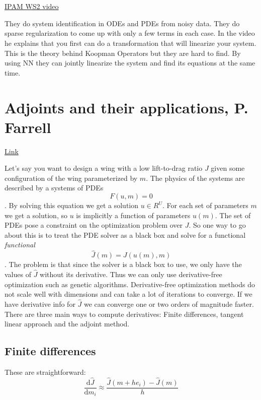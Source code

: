 \documentclass{article}
\newcommand{\citeall}[1]{\citeauthor{#1}}
\begin{document}
\section{\citeall{Brunton2016DiscoveringSystems}}

\href{http://www.ipam.ucla.edu/abstract/?tid=15783&pcode=MLPWS2}{IPAM WS2 video}

They do system identification in ODEs and PDEs from noisy data. They do sparse regularization to come up with only a few terms in each case. In the video he explains that you first can do a transformation that will linearize your system. This is the theory behind Koopman Operators but they are hard to find. By using NN they can jointly linearize the system and find its equations at the same time. 

\section{Adjoints and their applications, P. Farrell}

\href{dolfin-adjoint.org/en/latest/documentation/maths/index.html}{Link}

Let's say you want to design a wing with a low lift-to-drag ratio $J$ given some configuration of the wing parameterized by $m$. The physics of the systems are described by a systems of PDEs $$F(u,m)=0$$. By solving this equation we get a solution $u \in R^U$. For each set of parameters $m$ we get a solution, so $u$ is implicitly a function of parameters $u(m)$. The set of PDEs pose a constraint on the optimization problem over $J$. So one way to go about this is to treat the PDE solver as a black box and solve for a functional \textit{functional} $$\widehat{J}(m)=J(u(m),m)$$. The problem is that since the solver is a black box to use, we only have the values of $\widehat{J}$ without its derivative. Thus we can only use derivative-free optimization such as genetic algorithms. Derivative-free optimization methods do not scale well with dimensions and can take a lot of iterations to converge. If we have derivative info for $\widehat{J}$ we can converge one or two orders of magnitude faster. There are three main ways to compute derivatives: Finite differences, tangent linear approach and the adjoint method.

\subsection{Finite differences }
These are straightforward: 
$$
\frac{\mathrm{d} \widehat{J}}{\mathrm{d} m_{i}} \approx \frac{\widehat{J}\left(m+h e_{i}\right)-\widehat{J}(m)}{h}
$$
\end{document}
